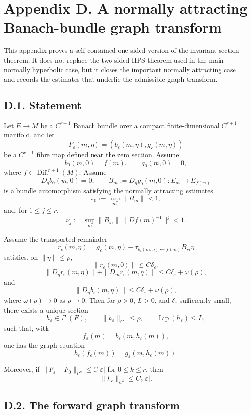 \documentclass[12pt,a4paper]{article}
\theoremstyle{plain}
\numberwithin{equation}{section}
\numberwithin{theorem}{section}
\begin{document}
\section{Appendix D. A normally attracting Banach-bundle graph transform}

This appendix proves a self-contained one-sided version of the invariant-section theorem. It does not replace the two-sided HPS theorem used in the main normally hyperbolic case, but it closes the important normally attracting case and records the estimates that underlie the admissible graph transform.

\subsection{D.1. Statement}

Let $E\to M$ be a $C^{r+1}$ Banach bundle over a compact finite-dimensional $C^{r+1}$ manifold, and let
\[
F_\varepsilon(m,\eta)=(b_\varepsilon(m,\eta),g_\varepsilon(m,\eta))
\]
be a $C^{r+1}$ fibre map defined near the zero section. Assume
\[
b_0(m,0)=f(m),
\qquad
g_0(m,0)=0,
\]
where $f\in\operatorname{Diff}^{r+1}(M)$. Assume
\[
D_\eta b_0(m,0)=0,
\qquad
B_m:=D_\eta g_0(m,0):E_m\to E_{f(m)}
\]
is a bundle automorphism satisfying the normally attracting estimates
\[
\nu_0:=\sup_m\|B_m\|<1,
\]
and, for $1\le j\le r$,
\[
\nu_j:=\sup_m\|B_m\|\,\|Df(m)^{-1}\|^j<1.
\]

Assume the transported remainder
\[
r_\varepsilon(m,\eta)
=
g_\varepsilon(m,\eta)-\tau_{b_\varepsilon(m,\eta)\leftarrow f(m)}B_m\eta
\]
satisfies, on $\|\eta\|\le\rho$,
\[
\|r_\varepsilon(m,0)\|\le C\delta_\varepsilon,
\]
\[
\|D_\eta r_\varepsilon(m,\eta)\|+
\|D_m r_\varepsilon(m,\eta)\|
\le C\delta_\varepsilon+
\omega(\rho),
\]
and
\[
\|D_\eta b_\varepsilon(m,\eta)\|
\le C\delta_\varepsilon+
\omega(\rho),
\]
where $\omega(\rho)\to0$ as $\rho\to0$. Then for $\rho>0$, $L>0$, and $\delta_\varepsilon$ sufficiently small, there exists a unique section
\[
h_\varepsilon\in\Gamma^r(E),
\qquad
\|h_\varepsilon\|_{C^0}\le\rho,
\qquad
\operatorname{Lip}(h_\varepsilon)\le L,
\]
such that, with
\[
f_\varepsilon(m)=b_\varepsilon(m,h_\varepsilon(m)),
\]
one has the graph equation
\[
h_\varepsilon(f_\varepsilon(m))
=
g_\varepsilon(m,h_\varepsilon(m)).
\]

Moreover, if $\|F_\varepsilon-F_0\|_{C^k}\le C|\varepsilon|$ for $0\le k\le r$, then
\[
\|h_\varepsilon\|_{C^k}
\le C_k|\varepsilon|.
\]

\subsection{D.2. The forward graph transform}
\end{document}
